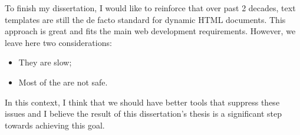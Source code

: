 \noindent
To finish my dissertation, I would like to reinforce that over past 2 decades, text templates are still the de facto standard for dynamic \ac{HTML} documents. This approach is great and fits the main web development requirements. However, we leave here two considerations:

\begin{itemize}
	\item They are slow;
	\item Most of the are not safe.
\end{itemize}

\noindent
In this context, I think that we should have better tools that suppress these issues and I believe the result of this dissertation's thesis is a significant step towards achieving this goal.